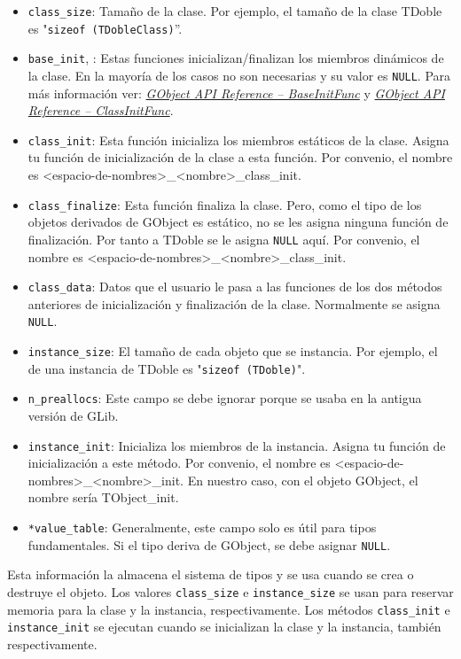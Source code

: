 \begin{itemize}
  \tightlist
\item \texttt{class\_size}: Tamaño de la clase. Por ejemplo, el tamaño de la clase
  \textsf{TDoble} es "\texttt{sizeof (TDobleClass)}''.
\item \texttt{base\_init}, : Estas funciones inicializan/finalizan
  los miembros dinámicos de la clase. En la mayoría de los casos no son necesarias y
  su valor es \texttt{NULL}.
  Para más información ver:
  \href{https://docs.gtk.org/gobject/callback.BaseInitFunc.html}
  {\textit{GObject API Reference -- BaseInitFunc}} y
  \href{https://docs.gtk.org/gobject/callback.ClassInitFunc.html}
  {\textit{GObject API Reference -- ClassInitFunc}}.
\item \texttt{class\_init}: Esta función inicializa los miembros estáticos de la clase. Asigna tu función de
  inicialización de la clase a esta función.
  Por convenio, el nombre es \textsf{<espacio-de-nombres>\_<nombre>\_class\_init}.
\item \texttt{class\_finalize}: Esta función finaliza la clase. Pero, como el tipo de los objetos derivados de
  \textsf{GObject} es estático, no se les asigna ninguna función de finalización. Por tanto a \textsf{TDoble}
  se le asigna \texttt{NULL} aquí.
  Por convenio, el nombre es \textsf{<espacio-de-nombres>\_<nombre>\_class\_init}.
\item \texttt{class\_data}: Datos que el usuario le pasa a las funciones de los dos métodos anteriores
  de inicialización y finalización de la clase. Normalmente se asigna \texttt{NULL}.
\item \texttt{instance\_size}: El tamaño de cada objeto que se instancia. Por ejemplo, el de una instancia
  de \textsf{TDoble} es "\texttt{sizeof (TDoble)}".
\item \texttt{n\_preallocs}: Este campo se debe ignorar porque se usaba en la antigua versión de \textsf{GLib}.
\item \texttt{instance\_init}: Inicializa los miembros de la instancia. Asigna tu función de inicialización a este
  método. Por convenio, el nombre es \textsf{<espacio-de-nombres>\_<nombre>\_init}. En nuestro caso, con
  el objeto \textsf{GObject}, el nombre sería \textsf{TObject\_init}.
\item \texttt{*value\_table}:  Generalmente, este campo solo es útil para tipos fundamentales. Si el tipo deriva
  de \textsf{GObject}, se debe asignar \texttt{NULL}.
\end{itemize}
Esta información la almacena el sistema de tipos y se usa cuando se crea o destruye el objeto.
Los valores \texttt{class\_size} e \texttt{instance\_size} se usan para reservar memoria para la clase y la instancia,
respectivamente. Los métodos \texttt{class\_init} e \texttt{instance\_init} se ejecutan cuando se inicializan
la clase y la instancia, también respectivamente.

